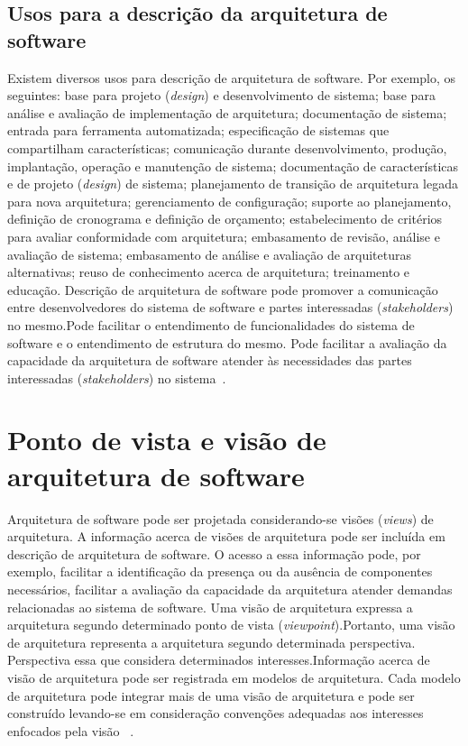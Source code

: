 \subsection{Usos para a descrição da arquitetura de software}

Existem diversos usos para descrição de arquitetura de software. Por exemplo, os seguintes: base para projeto (\emph{design}) e desenvolvimento de sistema; base para análise e avaliação de implementação de arquitetura; documentação de sistema; entrada para ferramenta automatizada; especificação de sistemas que compartilham características; comunicação durante desenvolvimento, produção, implantação, operação e manutenção de sistema; documentação de características e de projeto (\emph{design}) de sistema; planejamento de transição de arquitetura legada para nova arquitetura; gerenciamento de configuração; suporte ao planejamento, definição de cronograma e definição de orçamento; estabelecimento de critérios para avaliar conformidade com arquitetura; embasamento de revisão, análise e avaliação de sistema; embasamento de análise e avaliação de arquiteturas alternativas; reuso de conhecimento acerca de arquitetura; treinamento e educação.
Descrição de arquitetura de software pode promover a comunicação entre desenvolvedores do sistema de software e partes interessadas (\emph{stakeholders}) no mesmo.Pode facilitar o entendimento de funcionalidades do sistema de software e o entendimento de estrutura do mesmo. Pode facilitar a avaliação da capacidade da arquitetura de software atender às necessidades das partes interessadas (\emph{stakeholders}) no sistema~\cite{ISO_42010}. 

\section{Ponto de vista e visão de arquitetura de software}
\label{sec:viewpoint}

Arquitetura de software pode ser projetada considerando-se visões (\emph{views}) de arquitetura. 
A informação acerca de visões de arquitetura pode ser incluída em descrição de arquitetura de software.
O acesso a essa informação pode, por exemplo, facilitar a identificação da presença ou da ausência de componentes necessários, facilitar a avaliação da capacidade da arquitetura atender demandas relacionadas ao sistema de software.
Uma visão de arquitetura expressa a arquitetura segundo determinado ponto de vista (\emph{viewpoint}).Portanto, uma visão de arquitetura representa a arquitetura segundo determinada perspectiva. Perspectiva essa que considera determinados interesses.Informação acerca de visão de arquitetura pode ser registrada em modelos de arquitetura. Cada modelo de arquitetura pode integrar mais de uma visão de arquitetura e pode ser construído levando-se em consideração convenções adequadas aos interesses enfocados pela visão  ~\cite{ISO_42010}.

